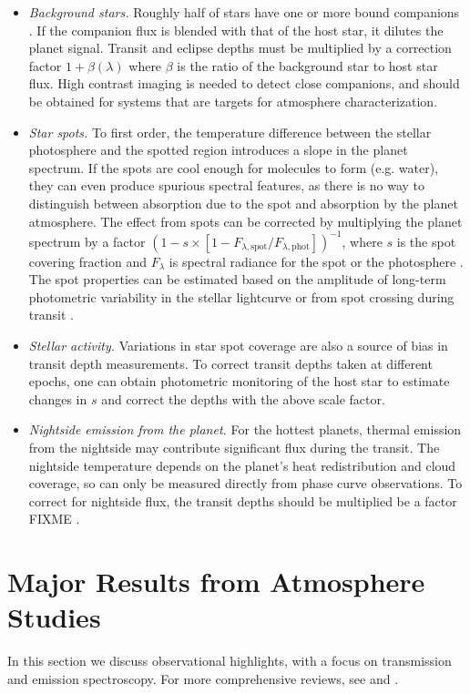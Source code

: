 \documentclass[graybox,natbib,nosecnum]{svmult}
\begin{document}
\begin{itemize}
\item{\emph{Background stars.} Roughly half of stars have one or more bound companions \citep{raghavan10}. If the companion flux is blended with that of the host star, it dilutes the planet signal. Transit and eclipse depths must be multiplied by a correction factor $1 + \beta(\lambda)$ where $\beta$ is the ratio of the background star to host star flux. High contrast imaging is needed to detect close companions, and should be obtained for systems that are targets for atmosphere characterization.}
\item{\emph{Star spots.} To first order, the temperature difference between the stellar photosphere and the spotted region introduces a slope in the planet spectrum. If the spots are cool enough for molecules to form (e.g. water), they can even produce spurious spectral features, as there is no way to distinguish between absorption due to the spot and absorption by the planet atmosphere. The effect from spots can be corrected by multiplying the planet spectrum by a factor $(1-s\times[1-F_{\lambda,\mathrm{spot}}/F_{\lambda,\mathrm{phot}}])^{-1}$, where $s$ is the spot covering fraction and $F_\lambda$ is spectral radiance for the spot or the photosphere \citep{mccullough14}. The spot properties can be estimated based on the amplitude of long-term photometric variability in the stellar lightcurve or from spot crossing during transit \citep[e.g.][]{pont08}.} 
\item{\emph{Stellar activity.} Variations in star spot coverage are also a source of bias in transit depth measurements. To correct transit depths taken at different epochs, one can obtain photometric monitoring of the host star to estimate changes in $s$ and correct the depths with the above scale factor.} 
\item{\emph{Nightside emission from the planet.} For the hottest planets, thermal emission from the nightside may contribute significant flux during the transit. The nightside temperature depends on the planet's heat redistribution and cloud coverage, so can only be measured directly from phase curve observations. To correct for nightside flux, the transit depths should be multiplied be a factor FIXME \citep{kipping10}.} 
\end{itemize}

\section{Major Results from Atmosphere Studies}
In this section we discuss observational highlights, with a focus on transmission and emission spectroscopy.  For more comprehensive reviews, see \cite{crossfield15} and \cite{deming17}. %
\end{document}
